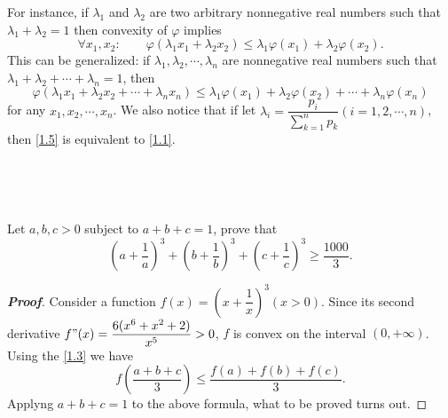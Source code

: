 \documentclass{memoir}
\begin{document}
For instance, if $\lambda_1$ and $\lambda_2$ are two arbitrary nonnegative real numbers such that $\lambda_1 + \lambda_2 = 1$ then convexity of $\varphi$ implies
\[\forall x_1, x_2 :\qquad \varphi \left(\lambda_1 x_1 +\lambda_2 x_2\right)\leqslant \lambda_1\varphi(x_1)+\lambda_2\varphi(x_2).\]
This can be generalized: if $\lambda_1,\lambda_2, \cdots , \lambda_n$ are nonnegative real numbers such that $\lambda_1 +\lambda_2+ \cdots + \lambda_n = 1$, then
\begin{equation}
\varphi \left( \lambda _{1}x_{1}+\lambda _{2}x_{2}+\cdots +\lambda _{n}x_n\right) \leqslant\lambda _{1}\varphi (x_{1})+\lambda _{2}\varphi (x_{2})+\cdots +\lambda_n\varphi(x_n)
\label{1.5}
\end{equation}
for any $x_1, x_2, \cdots , x_n$.
We also notice that if let $\lambda_i=\dfrac{p_i}{\sum_{k=1}^{n}p_k} (i=1,2,\cdots,n)$, then \autoref{1.5} is equivalent to \autoref{1.1}.
\par \ \par \
\begin{example}
	Let $a,b,c>0$ subject to $a+b+c=1$, prove that
	\[
	\left(a+\dfrac{1}{a}\right)^3+\left(b+\dfrac{1}{b}\right)^3+\left(c+\dfrac{1}{c}\right)^3\geqslant\dfrac{1000}{3}.
	\]
\end{example}
\begin{proof}[\textbf{Proof}]
	Consider a function $f(x)=\left(x+\dfrac{1}{x}\right)^3(x>0)$. Since its second derivative $f"(x)=\dfrac{6(x^6+x^2+2)}{x^5}>0$, $f$ is convex on the interval $(0,+\infty)$. Using the  \autoref{1.3} we have
	\[
	f(\dfrac{a+b+c}{3})\leqslant\dfrac{f(a)+f(b)+f(c)}{3}.
	\]
    Applyng $a+b+c=1$ to the above formula, what to be proved turns out.
	
\end{proof}
\par \ \par \ \par \ 
\end{document}
